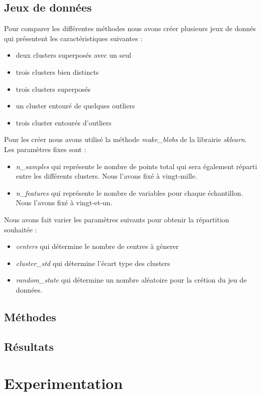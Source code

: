 \subsection{Jeux de données}
Pour comparer les différentes méthodes nous avons créer plusieurs jeux de donnés qui présentent les caractéristiques suivantes :
\begin{itemize}
    \item deux clusters superposés avec un seul
    \item  trois clusters bien distincts
    \item trois clusters superposés
    \item un cluster entouré de quelques outliers
    \item trois cluster entourés d’outliers
\end{itemize}
Pour les créer nous avons utilisé la méthode \textit{make_blobs} de la librairie \textit{sklearn}. Les paramètres fixes sont :
\begin{itemize}
    \item \textit{n_samples} qui représente le nombre de points total qui sera également réparti entre les différents clusters. Nous l'avons fixé à vingt-mille.
    \item \textit{n_features} qui représente le nombre de variables pour chaque échantillon. Nous l'avons fixé à vingt-et-un.
\end{itemize}
Nous avons fait varier les paramètres suivants pour obtenir la répartition souhaitée : 
\begin{itemize}
    \item \textit{centers} qui détermine le nombre de centres à génerer
    \item \textit{cluster_std} qui détermine l'écart type des clusters
    \item \textit{random_state} qui détermine un nombre aléatoire pour la crétion du jeu de données.
\end{itemize}
\subsection{Méthodes}
\subsection{Résultats}

\section{Experimentation}
